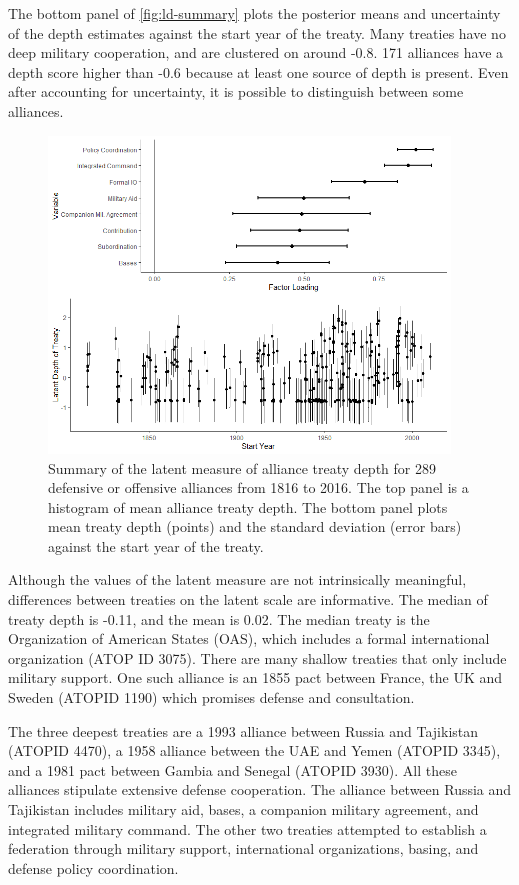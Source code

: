 \documentclass[12pt]{article}
\begin{document}
The bottom panel of \autoref{fig:ld-summary} plots the posterior means and uncertainty of the depth estimates against the start year of the treaty. 
Many treaties have no deep military cooperation, and are clustered on around -0.8.  
171 alliances have a depth score higher than -0.6 because at least one source of depth is present. 
Even after accounting for uncertainty, it is possible to distinguish between some alliances. 


\begin{figure}
	\centering
		\includegraphics[width=0.95\textwidth]{../figures/ld-summary.png}
	\caption{Summary of the latent measure of alliance treaty depth for 289 defensive or offensive alliances from 1816 to 2016. The top panel is a histogram of mean alliance treaty depth. The bottom panel plots mean treaty depth (points) and the standard deviation (error bars) against the start year of the treaty.}
	\label{fig:ld-summary}
\end{figure}


Although the values of the latent measure are not intrinsically meaningful, differences between treaties on the latent scale are informative. 
The median of treaty depth is -0.11, and the mean is 0.02. 
The median treaty is the Organization of American States (OAS), which includes a formal international organization (ATOP ID 3075). 
There are many shallow treaties that only include military support. 
One such alliance is an 1855 pact between France, the UK and Sweden (ATOPID 1190) which promises defense and consultation. 


The three deepest treaties are a 1993 alliance between Russia and Tajikistan (ATOPID 4470), a 1958 alliance between the UAE and Yemen (ATOPID 3345), and a 1981 pact between Gambia and Senegal (ATOPID 3930). 
All these alliances stipulate extensive defense cooperation. 
The alliance between Russia and Tajikistan includes military aid, bases, a companion military agreement, and integrated military command. 
The other two treaties attempted to establish a federation through military support, international organizations, basing, and defense policy coordination. 
\end{document}
